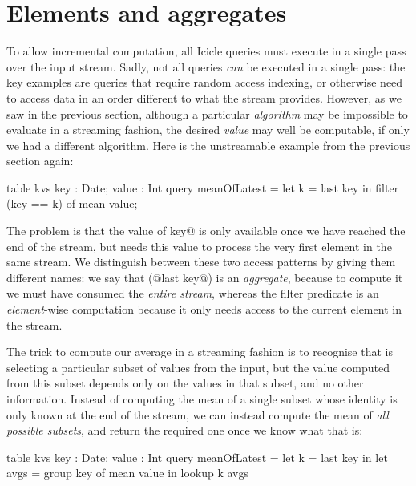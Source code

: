 
\section{Elements and aggregates}
\label{icicle:s:ElementsAndAggregates}
To allow incremental computation, all Icicle queries must execute in a single pass over the input stream.
Sadly, not all queries \emph{can} be executed in a single pass: the key examples are queries that require random access indexing, or otherwise need to access data in an order different to what the stream provides.
However, as we saw in the previous section, although a particular \emph{algorithm} may be impossible to evaluate in a streaming fashion, the desired \emph{value} may well be computable, if only we had a different algorithm.
Here is the unstreamable example from the previous section again:
\begin{icicle}
  table kvs { key : Date; value : Int }
  query meanOfLatest
   = let k = last key in
     filter (key == k) of mean value;
\end{icicle}

The problem is that the value of \Ic@last key@ is only available once we have reached the end of the stream, but \Ic@filter@ needs this value to process the very first element in the same stream.
We distinguish between these two access patterns by giving them different names: we say that (@last key@) is an \emph{aggregate}, because to compute it we must have consumed the \emph{entire stream}, whereas the filter predicate is an \emph{element}-wise computation because it only needs access to the current element in the stream.

The trick to compute our average in a streaming fashion is to recognise that \Ic@filter@ is selecting a particular subset of values from the input, but the value computed from this subset depends only on the values in that subset, and no other information. Instead of computing the mean of a single subset whose identity is only known at the end of the stream, we can instead compute the mean of \emph{all possible subsets}, and return the required one once we know what that is:
\begin{icicle}
  table kvs { key : Date; value : Int } 
  query meanOfLatest
   = let k    = last  key in
     let avgs = group key of mean value in
     lookup k avgs
\end{icicle}

